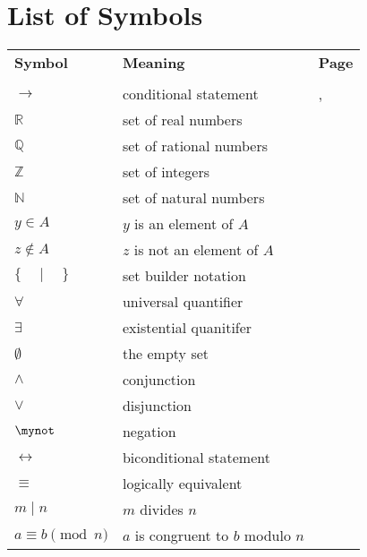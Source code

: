 \chapter{List of Symbols} \label{C:symbols}

\begin{tabular}{p{1in} p{2.5in} l}
\textbf{Symbol}              &  \textbf{Meaning}  &  \textbf{Page} \\
        &           &       \\ 
$\to$               &   conditional statement   &  \pageref{sym:cond}, \pageref{sym:cond2}  \\
$\mathbb{R}$        &  set of real numbers      &  \pageref{sym:reals}  \\
$\mathbb{Q}$        &  set of rational numbers  &  \pageref{sym:rationals} \\
$\mathbb{Z}$        &  set of integers          &  \pageref{sym:integers}  \\
$\mathbb{N}$        &  set of natural numbers   &  \pageref{sym:naturals}  \\
$y \in A$           &  $y$ is an element of $A$ &  \pageref{sym:elementof} \\
$z \notin A$        &  $z$ is not an element of $A$ & \pageref{sym:notelement} \\
$\{ \quad \mid \quad \}$  &  set builder notation   &  \pageref{sym:setbuilder} \\
$\forall$          &  universal quantifier  &  \pageref{sym:forall} \\
$\exists$          &  existential quanitifer  &  \pageref{sym:exist} \\
$\emptyset$        &  the empty set  &  \pageref{sym:empty} \\
$\wedge$           &  conjunction  &  \pageref{sym:and} \\
$\vee$             &  disjunction  &  \pageref{sym:or} \\
$\mynot$           &  negation                      &  \pageref{sym:not} \\
$\leftrightarrow$  &  biconditional statement       &  \pageref{sym:bicond}  \\
$\equiv$           &  logically equivalent          &  \pageref{sym:logequiv}  \\
$m \mid n$	       &  $m$ divides $n$                       &  \pageref{sym:divides} \\
$a \equiv b \pmod n$   &  $a$ is congruent to $b$ modulo $n$  &  \pageref{sym:congruence} \\

\end{tabular}
